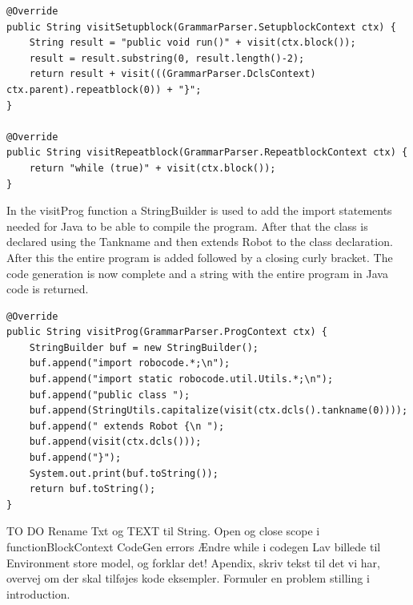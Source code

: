 \begin{lstlisting}[caption={CodeGen - visitSetupblock \& visitRepeatblock functions}, label={VSRB}]
@Override
public String visitSetupblock(GrammarParser.SetupblockContext ctx) {
    String result = "public void run()" + visit(ctx.block());
    result = result.substring(0, result.length()-2);
    return result + visit(((GrammarParser.DclsContext) ctx.parent).repeatblock(0)) + "}";
}

@Override
public String visitRepeatblock(GrammarParser.RepeatblockContext ctx) {
    return "while (true)" + visit(ctx.block());
}
\end{lstlisting}

In the visitProg function a StringBuilder is used to add the import statements needed for Java to be able to compile the program. After that the class is declared using the Tankname and then extends Robot to the class declaration. After this the entire program is added followed by a closing curly bracket. The code generation is now complete and a string with the entire program in Java code is returned. 

\begin{lstlisting}[caption={CodeGen - visitProg function}, label={VP}]
@Override
public String visitProg(GrammarParser.ProgContext ctx) {
    StringBuilder buf = new StringBuilder();
    buf.append("import robocode.*;\n");
    buf.append("import static robocode.util.Utils.*;\n");
    buf.append("public class ");
    buf.append(StringUtils.capitalize(visit(ctx.dcls().tankname(0))));
    buf.append(" extends Robot {\n ");
    buf.append(visit(ctx.dcls()));
    buf.append("}");
    System.out.print(buf.toString());
    return buf.toString();
}
\end{lstlisting}


TO DO
Rename Txt og TEXT til String.
Open og close scope i functionBlockContext
CodeGen errors
Ændre while i codegen
Lav billede til Environment store model, og forklar det!
Apendix, skriv tekst til det vi har, overvej om der skal tilføjes kode eksempler.
Formuler en problem stilling i introduction.


